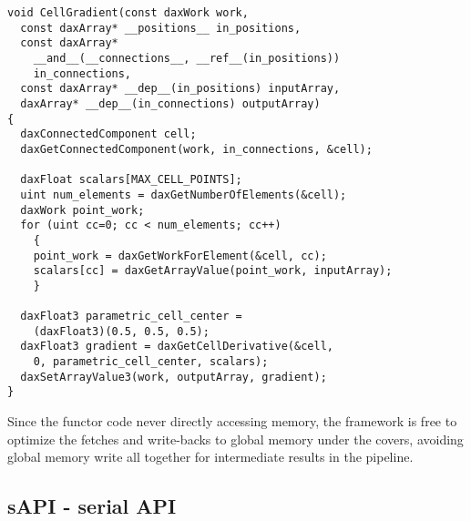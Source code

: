 \documentclass{vgtc}                          %
\newcommand*{\keyterm}[1]{\emph{#1}}
\begin{document}
\small{
\begin{verbatim}
void CellGradient(const daxWork work,
  const daxArray* __positions__ in_positions,
  const daxArray*
    __and__(__connections__, __ref__(in_positions))
    in_connections,
  const daxArray* __dep__(in_positions) inputArray,
  daxArray* __dep__(in_connections) outputArray)
{
  daxConnectedComponent cell;
  daxGetConnectedComponent(work, in_connections, &cell);

  daxFloat scalars[MAX_CELL_POINTS];
  uint num_elements = daxGetNumberOfElements(&cell);
  daxWork point_work;
  for (uint cc=0; cc < num_elements; cc++)
    {
    point_work = daxGetWorkForElement(&cell, cc);
    scalars[cc] = daxGetArrayValue(point_work, inputArray);
    }

  daxFloat3 parametric_cell_center =
    (daxFloat3)(0.5, 0.5, 0.5);
  daxFloat3 gradient = daxGetCellDerivative(&cell,
    0, parametric_cell_center, scalars);
  daxSetArrayValue3(work, outputArray, gradient);
}
\end{verbatim}
}

Since the functor code never directly accessing memory, the framework is free to
optimize the fetches and write-backs to global memory under the covers, avoiding
global memory write all together for intermediate results in the pipeline.


\subsection{sAPI - serial API}






\end{document}
